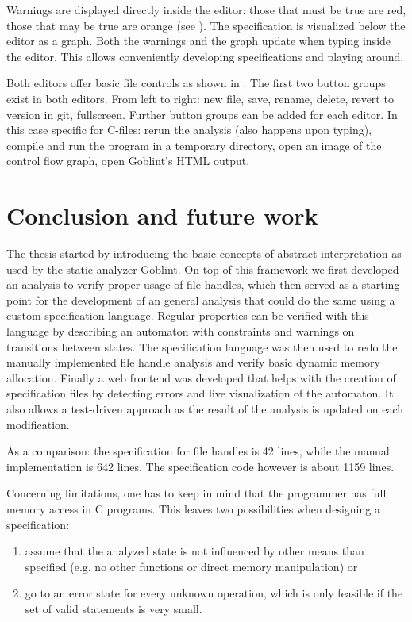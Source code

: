 Warnings are displayed directly inside the editor: those that must be true are red, those that may be true are orange (see ).
The specification is visualized below the editor as a graph.
Both the warnings and the graph update when typing inside the editor. This allows conveniently developing specifications and playing around.

Both editors offer basic file controls as shown in . The first two button groups exist in both editors. From left to right: new file, save, rename, delete, revert to version in git, fullscreen. Further button groups can be added for each editor. In this case specific for C-files: rerun the analysis (also happens upon typing), compile and run the program in a temporary directory, open an image of the control flow graph, open Goblint's HTML output.


\chapter{Conclusion and future work}
The thesis started by introducing the basic concepts of abstract interpretation as used by the static analyzer Goblint. On top of this framework we first developed an analysis to verify proper usage of file handles, which then served as a starting point for the development of an general analysis that could do the same using a custom specification language. Regular properties can be verified with this language by describing an automaton with constraints and warnings on transitions between states.
The specification language was then used to redo the manually implemented file handle analysis and verify basic dynamic memory allocation. Finally a web frontend was developed that helps with the creation of specification files by detecting errors and live visualization of the automaton. It also allows a test-driven approach as the result of the analysis is updated on each modification.

As a comparison: the specification for file handles is 42 lines, while the manual implementation is 642 lines. The specification code however is about 1159 lines. %

Concerning limitations, one has to keep in mind that the programmer has full memory access in C programs. This leaves two possibilities when designing a specification:
\begin{enumerate}
\item assume that the analyzed state is not influenced by other means than specified (e.g. no other functions or direct memory manipulation) or
\item go to an error state for every unknown operation, which is only feasible if the set of valid statements is very small.
\end{enumerate}

